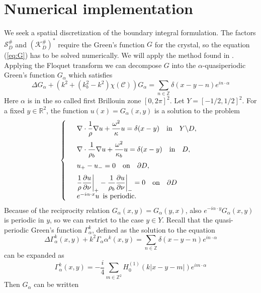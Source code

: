 \documentclass[a4paper]{article}
\theoremstyle{definition}
\newcommand{\Z}{\mathbb{Z}}
\newcommand{\R}{\mathbb{R}}
\newcommand{\C}{\mathcal{C}}
\newcommand{\Scrystal}{\mathcal{S}_D^\#}
\newcommand{\KstarC}{(\mathcal{K}_D^{\#})^*}
\newcommand{\ds}{\displaystyle}
\newcommand{\eqnref}[1]{(\ref {#1})}
\def\nm{\noalign{\medskip}}
\begin{document}
\section{Numerical implementation}
We seek a spatial discretization of the boundary integral formulation. The factors $\Scrystal$ and $\KstarC$ require the Green's function $G$ for the crystal, so the equation \eqnref{eq:G} has to be solved numerically. We will apply the method found in \cite{bandgap}.
Applying the Floquet transform we can decompose $G$ into the $\alpha$-quasiperiodic Green's function $G_\alpha$ which satisfies
\begin{equation*}
\Delta G_\alpha + (k^2+(k_b^2-k^2)\chi(\C))G_\alpha = \sum_{n\in \Z} \delta(x-y-n)e^{in\cdot\alpha}
\end{equation*}
Here $\alpha$ is in the so called first Brillouin zone $[0,2\pi]^2$. Let $Y= [-1/2,1/2]^2$. For a fixed $y\in \R^2$, the function $u(x)=G_\alpha(x,y)$ is a solution to the problem
\begin{equation} \label{eq:quasiperiodic}
\left\{
\begin{array} {ll}
&\ds \nabla \cdot \frac{1}{\rho} \nabla  u+ \frac{\omega^2}{\kappa} u  = \delta(x-y) \quad \text{in} \quad Y \backslash D, \\
\nm
&\ds \nabla \cdot \frac{1}{\rho_b} \nabla  u+ \frac{\omega^2}{\kappa_b} u  = \delta(x-y) \quad \text{in} \quad D, \\
\nm
&\ds  u_{+} -u_{-}  =0   \quad \text{on} \quad \partial D, \\
\nm
& \ds  \frac{1}{\rho} \frac{\partial u}{\partial \nu} \bigg|_{+} - \frac{1}{\rho_b} \frac{\partial u}{\partial \nu} \bigg|_{-} =0 \quad \text{on} \quad \partial D \\
&  e^{-i \alpha \cdot x} u  \,\,\,  \text{is periodic.}
\end{array}
\right.
\end{equation}
Because of the reciprocity relation $G_\alpha(x,y) = G_\alpha(y,x)$, also $e^{-i \alpha \cdot y} G_\alpha(x,y)$ is periodic in $y$, so we can restrict to the case $y\in Y$. Recall that the quasi-periodic Green's function $\Gamma_\alpha^k$, defined as the solution to the equation
\begin{equation*}
\Delta \Gamma_\alpha^k(x,y) + k^2\Gamma_\alpha\alpha^k(x,y) = \sum_{n\in \Z} \delta(x-y-n)e^{in\cdot\alpha}
\end{equation*}
can be expanded as 
\begin{equation} \label{eq:quasihomogenious}
\Gamma_\alpha^k(x,y) = -\frac{i}{4}\sum_{m\in \Z^2} H_0^{(1)}(k|x-y-m|)e^{im\cdot\alpha}
\end{equation}
Then $G_\alpha$ can be written
\end{document}
